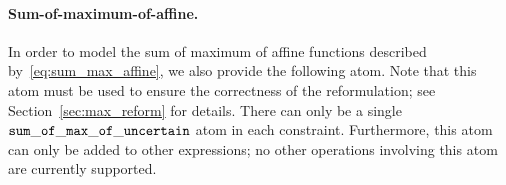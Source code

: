 \paragraph{Sum-of-maximum-of-affine.}
In order to model the sum of maximum of affine functions described by~\eqref{eq:sum_max_affine}, we also provide the following atom. Note that this atom must be used to ensure the correctness of the reformulation; see Section~\ref{sec:max_reform} for details. There can only be a single $\tt{sum\_of\_max\_of\_uncertain}$ atom in each constraint. Furthermore, this atom can only be added to other expressions; no other operations involving this atom are currently supported. 

